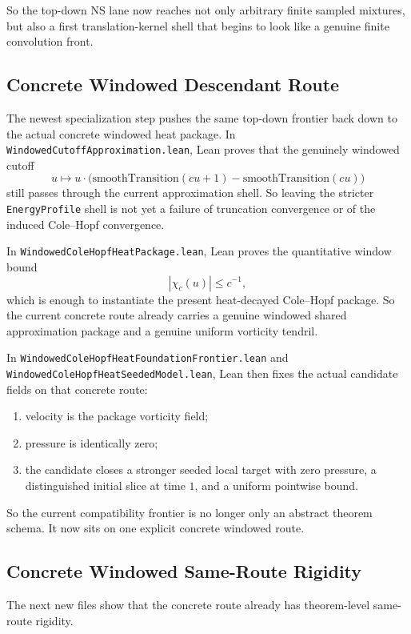 \documentclass[11pt]{article}
\begin{document}
So the top-down NS lane now reaches not only arbitrary finite sampled mixtures,
but also a first translation-kernel shell that begins to look like a genuine
finite convolution front.

\subsection{Concrete Windowed Descendant Route}

The newest specialization step pushes the same top-down frontier back down to
the actual concrete windowed heat package.  In
\texttt{WindowedCutoffApproximation.lean}, Lean proves that the genuinely
windowed cutoff
\[
u \mapsto
u \cdot \bigl(\mathrm{smoothTransition}(cu+1)-\mathrm{smoothTransition}(cu)\bigr)
\]
still passes through the current approximation shell.  So leaving the stricter
\texttt{EnergyProfile} shell is not yet a failure of truncation convergence or
of the induced Cole--Hopf convergence.

In \texttt{WindowedColeHopfHeatPackage.lean}, Lean proves the quantitative
window bound
\[
|\chi_c(u)| \le c^{-1},
\]
which is enough to instantiate the present heat-decayed Cole--Hopf package.
So the current concrete route already carries a genuine windowed shared
approximation package and a genuine uniform vorticity tendril.

In \texttt{WindowedColeHopfHeatFoundationFrontier.lean} and
\texttt{WindowedColeHopfHeatSeededModel.lean}, Lean then fixes the actual
candidate fields on that concrete route:
\begin{enumerate}[leftmargin=1.5em]
  \item velocity is the package vorticity field;
  \item pressure is identically zero;
  \item the candidate closes a stronger seeded local target with zero pressure,
  a distinguished initial slice at time \(1\), and a uniform pointwise bound.
\end{enumerate}

So the current compatibility frontier is no longer only an abstract theorem
schema.  It now sits on one explicit concrete windowed route.

\subsection{Concrete Windowed Same-Route Rigidity}

The next new files show that the concrete route already has theorem-level
same-route rigidity.
\end{document}

